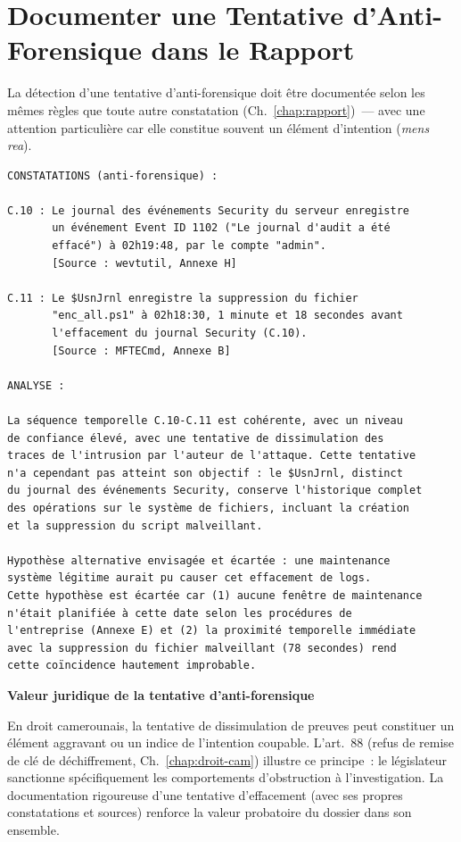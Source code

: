 \section{Documenter une Tentative d'Anti-Forensique dans le Rapport}
\label{sec:documentation-anti-for}

La détection d'une tentative d'anti-forensique doit être documentée
selon les mêmes règles que toute autre constatation
(Ch.~\ref{chap:rapport})~--- avec une attention particulière car
elle constitue souvent un élément d'intention (\textit{mens rea}).

\begin{lstlisting}[language=bash_forensique,
    caption={Exemple de constatation et analyse --- tentative d'anti-forensique}]
CONSTATATIONS (anti-forensique) :

C.10 : Le journal des événements Security du serveur enregistre
       un événement Event ID 1102 ("Le journal d'audit a été
       effacé") à 02h19:48, par le compte "admin".
       [Source : wevtutil, Annexe H]

C.11 : Le $UsnJrnl enregistre la suppression du fichier
       "enc_all.ps1" à 02h18:30, 1 minute et 18 secondes avant
       l'effacement du journal Security (C.10).
       [Source : MFTECmd, Annexe B]

ANALYSE :

La séquence temporelle C.10-C.11 est cohérente, avec un niveau
de confiance élevé, avec une tentative de dissimulation des
traces de l'intrusion par l'auteur de l'attaque. Cette tentative
n'a cependant pas atteint son objectif : le $UsnJrnl, distinct
du journal des événements Security, conserve l'historique complet
des opérations sur le système de fichiers, incluant la création
et la suppression du script malveillant.

Hypothèse alternative envisagée et écartée : une maintenance
système légitime aurait pu causer cet effacement de logs.
Cette hypothèse est écartée car (1) aucune fenêtre de maintenance
n'était planifiée à cette date selon les procédures de
l'entreprise (Annexe E) et (2) la proximité temporelle immédiate
avec la suppression du fichier malveillant (78 secondes) rend
cette coïncidence hautement improbable.
\end{lstlisting}

\begin{boxjuris}
\textbf{Valeur juridique de la tentative d'anti-forensique}

En droit camerounais, la tentative de dissimulation de preuves
peut constituer un élément aggravant ou un indice de l'intention
coupable. L'art.~88  (refus de remise de clé de
déchiffrement, Ch.~\ref{chap:droit-cam}) illustre ce principe~:
le législateur sanctionne spécifiquement les comportements
d'obstruction à l'investigation. La documentation rigoureuse
d'une tentative d'effacement (avec ses propres constatations
et sources) renforce la valeur probatoire du dossier dans
son ensemble.
\end{boxjuris}


